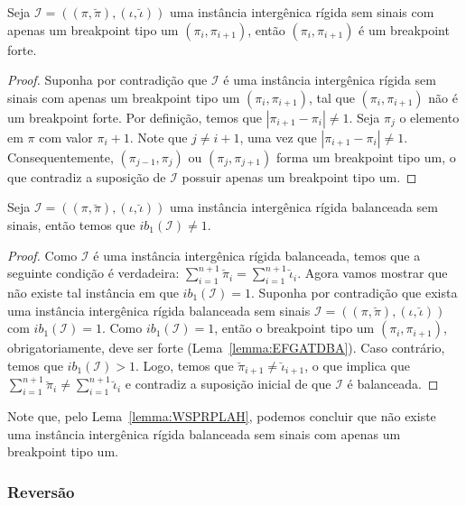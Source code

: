 \begin{lemma}\label{lemma:EFGATDBA}
Seja $\mathcal{I}=((\pi,\breve\pi),(\iota,\breve\iota))$ uma instância intergênica rígida sem sinais com apenas um breakpoint tipo um $(\pi_i,\pi_{i+1})$, então $(\pi_i,\pi_{i+1})$ é um breakpoint forte.
\end{lemma}
\begin{proof}
Suponha por contradição que $\mathcal{I}$ é uma instância intergênica rígida sem sinais com apenas um breakpoint tipo um $(\pi_i,\pi_{i+1})$, tal que $(\pi_i,\pi_{i+1})$ não é um breakpoint forte. Por definição, temos que $|\pi_{i+1}-\pi_i| \ne 1$. Seja $\pi_j$ o elemento em $\pi$ com valor $\pi_i + 1$. Note que $j \ne {i+1}$, uma vez que $|\pi_{i+1}-\pi_i| \ne 1$. Consequentemente, $(\pi_{j-1},\pi_{j})$ ou $(\pi_{j},\pi_{j+1})$ forma um breakpoint tipo um, o que contradiz a suposição de $\mathcal{I}$ possuir apenas um breakpoint tipo um.
\end{proof}

\begin{lemma}\label{lemma:WSPRPLAH}
Seja $\mathcal{I}=((\pi,\breve\pi),(\iota,\breve\iota))$ uma instância intergênica rígida balanceada sem sinais, então temos que $ib_1(\mathcal{I}) \ne 1$.
\end{lemma}
\begin{proof}
Como $\mathcal{I}$ é uma instância intergênica rígida balanceada, temos que a seguinte condição é verdadeira: $\sum_{i=1}^{n+1}\breve\pi_i = \sum_{i=1}^{n+1}\breve\iota_i$. Agora vamos mostrar que não existe tal instância em que $ib_1(\mathcal{I}) = 1$. Suponha por contradição que exista uma instância intergênica rígida balanceada sem sinais $\mathcal{I}=((\pi,\breve\pi),(\iota,\breve\iota))$ com $ib_1(\mathcal{I}) = 1$. Como $ib_1(\mathcal{I}) = 1$, então o breakpoint tipo um $(\pi_i,\pi_{i+1})$, obrigatoriamente, deve ser forte (Lema~\ref{lemma:EFGATDBA}). Caso contrário, temos que $ib_1(\mathcal{I}) > 1$. Logo, temos que $\breve\pi_{i+1} \ne \breve\iota_{i+1}$, o que implica que $\sum_{i=1}^{n+1}\breve\pi_i \ne \sum_{i=1}^{n+1}\breve\iota_i$ e contradiz a suposição inicial de que $\mathcal{I}$ é balanceada.
\end{proof}

Note que, pelo Lema~\ref{lemma:WSPRPLAH}, podemos concluir que não existe uma instância intergênica rígida balanceada sem sinais com apenas um breakpoint tipo um.

\subsubsection{Reversão}


